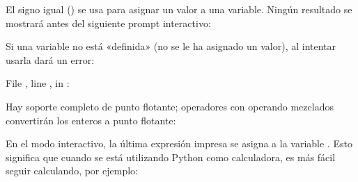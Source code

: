 \documentclass[a5paper,10pt,spanish]{sphinxmanual}
\begin{document}
\sphinxAtStartPar
El signo igual (\sphinxcode{\sphinxupquote{=}}) se usa para asignar un valor a una variable. Ningún resultado se mostrará antes del siguiente prompt interactivo:

\begin{sphinxVerbatim}[commandchars=\\\{\}]
  
    
  
\end{sphinxVerbatim}

\sphinxAtStartPar
Si una variable no está «definida» (no se le ha asignado un valor), al intentar usarla dará un error:

\begin{sphinxVerbatim}[commandchars=\\\{\}]
  
  File , line , in 
: 
\end{sphinxVerbatim}

\sphinxAtStartPar
Hay soporte completo de punto flotante; operadores con operando mezclados convertirán los enteros a punto flotante:

\begin{sphinxVerbatim}[commandchars=\\\{\}]
    
\end{sphinxVerbatim}

\sphinxAtStartPar
En el modo interactivo, la última expresión impresa se asigna a la variable \sphinxcode{\sphinxupquote{\_}}.  Esto significa que cuando se está utilizando Python como calculadora, es más fácil seguir calculando, por ejemplo:

\begin{sphinxVerbatim}[commandchars=\\\{\}]
    
  
  
  
 
\end{sphinxVerbatim}
\end{document}
